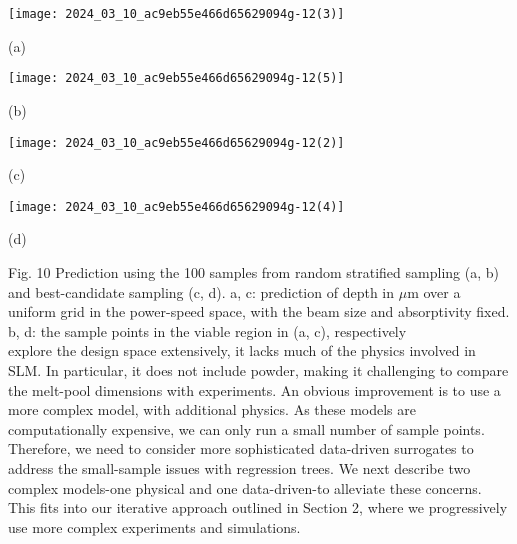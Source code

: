\documentclass[10pt]{article}
\begin{document}
\begin{center}
\texttt{[image: 2024\_03\_10\_ac9eb55e466d65629094g-12(3)]}
\end{center}

(a)

\begin{center}
\texttt{[image: 2024\_03\_10\_ac9eb55e466d65629094g-12(5)]}
\end{center}

(b)

\begin{center}
\texttt{[image: 2024\_03\_10\_ac9eb55e466d65629094g-12(2)]}
\end{center}

(c)

\begin{center}
\texttt{[image: 2024\_03\_10\_ac9eb55e466d65629094g-12(4)]}
\end{center}

(d)

Fig. 10 Prediction using the 100 samples from random stratified sampling (a, b) and best-candidate sampling (c, d). a, c: prediction of depth in $\mu \mathrm{m}$ over a uniform grid in the power-speed space, with the beam size and absorptivity fixed. b, d: the sample points in the viable region in (a, c), respectively\\
explore the design space extensively, it lacks much of the physics involved in SLM. In particular, it does not include powder, making it challenging to compare the melt-pool dimensions with experiments. An obvious improvement is to use a more complex model, with additional physics. As these models are computationally expensive, we can only run a small number of sample points. Therefore, we need to consider more sophisticated data-driven surrogates to address the small-sample issues with regression trees. We next describe two complex models-one physical and one data-driven-to alleviate these concerns. This fits into our iterative approach outlined in Section 2, where we progressively use more complex experiments and simulations.
\end{document}

